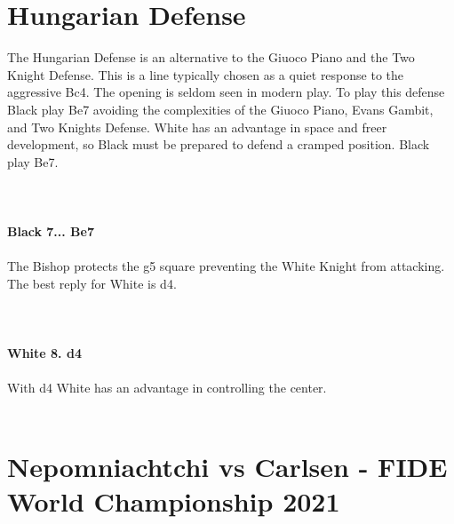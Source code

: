 \documentclass{article}
\begin{document}
\section{ Hungarian Defense}

The Hungarian Defense is an alternative to the Giuoco Piano and the Two Knight Defense. This is a line typically chosen as a quiet response to the aggressive Bc4. The opening is seldom seen in modern play. To play this defense Black play Be7 avoiding the complexities of the Giuoco Piano, Evans Gambit, and Two Knights Defense. White has an advantage in space and freer development, so Black must be prepared to defend a cramped position. Black play Be7.\\
\\

\\
\\
\textbf{Black 7... Be7}\\
\\
The Bishop protects the g5 square preventing the White Knight from attacking. The best reply for White is d4.\\
\\

\\
\\
\textbf{White 8. d4}\\
\\
With d4 White has an advantage in controlling the center.\\
\\
\section{ Nepomniachtchi vs Carlsen - FIDE World Championship 2021}
\end{document}
